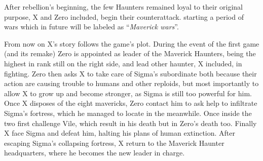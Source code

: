 After rebellion's beginning, the few Haunters remained loyal to their original purpose, X and Zero included, begin their counterattack. starting a period of wars which in future will be labeled as ``\emph{Maverick wars}''. 

From now on X's story follows the game's plot. During the event of the first game (and its remake) Zero is appointed as leader of the Maverick Haunters, being the highest in rank still on the right side, and lead other haunter, X included, in fighting. Zero then asks  X to take care of Sigma's subordinate both because their action are causing trouble to humans and other reploids, but most importantly to allow X to grow up and become stronger, as Sigma is still too powerful for him. Once X disposes of the eight mavericks, Zero contact him to ask help to infiltrate Sigma's fortress, which he managed to locate in the meanwhile. Once inside the two first challenge Vile, which result in his death but in Zero's death too. Finally X face Sigma and defeat him, halting his plans of human extinction. After escaping Sigma's collapsing fortress, X return to the Maverick Haunter headquarters, where he becomes the new leader in charge.
